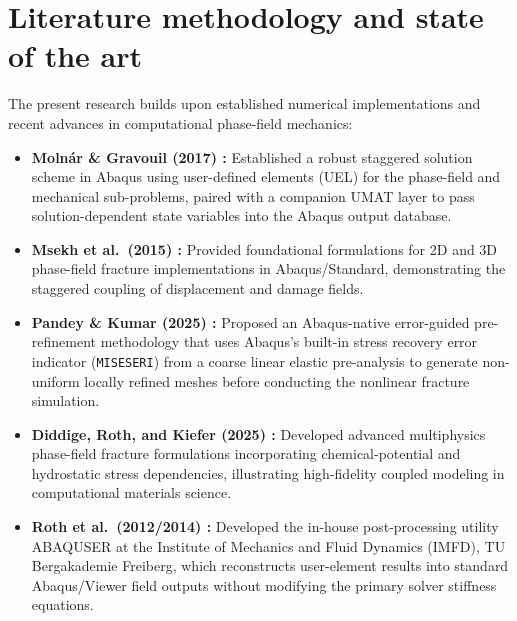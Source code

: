 \section{Literature methodology and state of the art}
The present research builds upon established numerical implementations and recent advances in computational phase-field mechanics:
\begin{itemize}
  \item \textbf{Moln\'ar \& Gravouil (2017) \citep{Molnar2017}:} Established a robust staggered solution scheme in Abaqus using user-defined elements (UEL) for the phase-field and mechanical sub-problems, paired with a companion UMAT layer to pass solution-dependent state variables into the Abaqus output database.
  \item \textbf{Msekh et al.\ (2015) \citep{Msekh2015}:} Provided foundational formulations for 2D and 3D phase-field fracture implementations in Abaqus/Standard, demonstrating the staggered coupling of displacement and damage fields.
  \item \textbf{Pandey \& Kumar (2025) \citep{Pandey2025}:} Proposed an Abaqus-native error-guided pre-refinement methodology that uses Abaqus's built-in stress recovery error indicator (\texttt{MISESERI}) from a coarse linear elastic pre-analysis to generate non-uniform locally refined meshes before conducting the nonlinear fracture simulation.
  \item \textbf{Diddige, Roth, and Kiefer (2025) \citep{Diddige2025}:} Developed advanced multiphysics phase-field fracture formulations incorporating chemical-potential and hydrostatic stress dependencies, illustrating high-fidelity coupled modeling in computational materials science.
  \item \textbf{Roth et al.\ (2012/2014) \citep{Roth2014}:} Developed the in-house post-processing utility \textsc{ABAQUSER} at the Institute of Mechanics and Fluid Dynamics (IMFD), TU Bergakademie Freiberg, which reconstructs user-element results into standard Abaqus/Viewer field outputs without modifying the primary solver stiffness equations.
\end{itemize}

